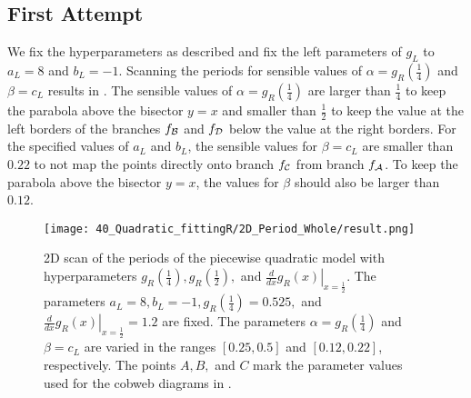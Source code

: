 \subsection{First Attempt}
\label{sec:setup.quad.hyper.1}

We fix the hyperparameters as described and fix the left parameters of $g_L$ to $a_L = 8$ and $b_L = -1$.
Scanning the periods for sensible values of $\alpha = g_R\left(\frac{1}{4}\right)$ and $\beta = c_L$ results in .
The sensible values of $\alpha = g_R\left(\frac{1}{4}\right)$ are larger than $\frac{1}{4}$ to keep the parabola above the bisector $y = x$ and smaller than $\frac{1}{2}$ to keep the value at the left borders of the branches $f_{\mathcal{B}}$ and $f_{\mathcal{D}}$ below the value at the right borders.
For the specified values of $a_L$ and $b_L$, the sensible values for $\beta = c_L$ are smaller than $0.22$ to not map the points directly onto branch $f_{\mathcal{C}}$ from branch $f_{\mathcal{A}}$.
To keep the parabola above the bisector $y = x$, the values for $\beta$ should also be larger than $0.12$.

\begin{figure}
	\centering
	\texttt{[image: 40\_Quadratic\_fittingR/2D\_Period\_Whole/result.png]}
	\caption[2D scan of the periods of the quadratic model with hyperparameters]{
	2D scan of the periods of the piecewise quadratic model with hyperparameters $g_R\left(\frac{1}{4}\right), g_R\left(\frac{1}{2}\right),$ and $\left. \frac{d}{dx} g_R\left(x\right) \right|_{x = \frac{1}{2}}$.
	The parameters $a_L = 8, b_L = -1, g_R\left(\frac{1}{4}\right) = 0.525,$ and $\left. \frac{d}{dx} g_R\left(x\right) \right|_{x = \frac{1}{2}} = 1.2$ are fixed.
	The parameters $\alpha = g_R\left(\frac{1}{4}\right)$ and $\beta = c_L$ are varied in the ranges $[0.25, 0.5]$ and $[0.12, 0.22]$, respectively.
	The points $A, B,$ and $C$ mark the parameter values used for the cobweb diagrams in .
	}
	\label{fig:setup.quad.hyper.1.period}
\end{figure}

